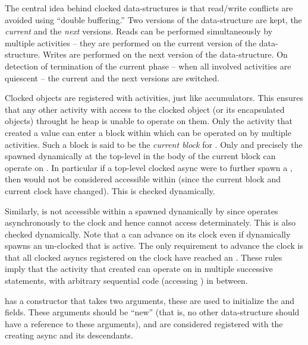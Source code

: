 The central idea behind clocked data-structures is that read/write
conflicts are avoided using ``double buffering.'' Two versions of the
data-structure are kept, the {\em current} and the {\em next}
versions. Reads can be performed simultaneously by multiple activities
-- they are performed on the current version of the
data-structure. Writes are performed on the next version of the
data-structure. On detection of termination of the current phase --
when all involved activities are quiescent -- the current and the next
versions are switched.

Clocked objects are registered with activities, just like
accumulators.  This ensures that any other activity with access to the
clocked object (or its encapsulated objects) throught he heap is
unable to operate on them.  Only the activity that created a
 value  can enter a
 block within which  can be operated on
by multiple activities. Such a block is said to be the {\em current
  block} for . Only and precisely the 
spawned dynamically at the top-level in the body of the current block
can operate on . In particular if a top-level clocked async
were to further spawn a , then  would
not be considered accessible within  (since the current block
and current clock have changed).  This is checked dynamically.

Similarly,  is not accessible within a  spawned
dynamically by  since  operates asynchronously to the
clock and hence cannot access  determinately. This is also
checked dynamically. Note that a  can advance
on its clock even if  dynamically spawns an un-clocked
 that is active. The only requirement to advance the clock
is that all clocked asyncs registered on the clock have reached an
. These rules imply that the activity that created
 can operate on  in multiple successive  statements, with arbitrary sequential code (accessing
) in between.

 has a constructor that takes two  arguments,
these are used to initialize the  and  fields. These arguments
should be ``new'' (that is, no other data-structure should have a
reference to these arguments), and are considered registered with the
creating async and its descendants.

